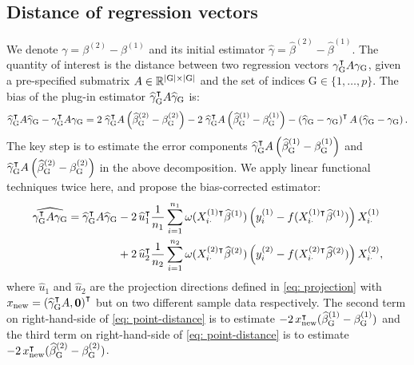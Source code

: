 \subsection{Distance of regression vectors}
\label{subsec: distance}
We denote $\gamma = \beta^{(2)} - \beta^{(1)}$ and its initial estimator $\widehat{\gamma} = \widehat{\beta}^{(2)} - \widehat{\beta}^{(1)}$. The quantity of interest is the distance between two regression vectors $\gamma^\intercal_{\mathrm{G}} A \gamma_{\mathrm{G}}$, given a pre-specified submatrix $A \in \mathbb{R}^{|\mathrm{G}|\times |\mathrm{G}|}$ and the set of indices $\mathrm{G} \in \{1,\ldots, p\}$. The bias of the plug-in estimator $\widehat{\gamma}^\intercal_{\mathrm{G}} A \widehat{\gamma}_{\mathrm{G}}$ is:
\begin{equation*}
    \widehat{\gamma}^\intercal_{\mathrm{G}} A \widehat{\gamma}_{\mathrm{G}} - \gamma^\intercal_{\mathrm{G}} A \gamma_{\mathrm{G}} = 2\; \widehat{\gamma}^\intercal_{\mathrm{G}} A \left(\widehat{\beta}^{(2)}_{\mathrm{G}} - \beta^{(2)}_{\mathrm{G}}\right) - 2\; \widehat{\gamma}^\intercal_{\mathrm{G}} A \left(\widehat{\beta}^{(1)}_{\mathrm{G}} - \beta^{(1)}_{\mathrm{G}}\right) - \left(\widehat{\gamma}_{\mathrm{G}} - \gamma_{\mathrm{G}}\right)^\intercal A \left(\widehat{\gamma}_{\mathrm{G}} - \gamma_{\mathrm{G}}\right).
\end{equation*}
The key step is to estimate the error components $\widehat{\gamma}_{\mathrm{G}}^\intercal A \left(\widehat{\beta}_{\mathrm{G}}^{(1)} -  \beta_{\mathrm{G}}^{(1)}\right)$ and $ \widehat{\gamma}_{\mathrm{G}}^\intercal A \left(\widehat{\beta}_{\mathrm{G}}^{(2)} - \beta_{\mathrm{G}}^{(2)}\right) $ in the above decomposition. We apply linear functional techniques twice here, and propose the bias-corrected estimator:
\begin{equation}
    \begin{aligned}
        \widehat{\gamma_{\mathrm{G}}^\intercal A \gamma_{\mathrm{G}}} = 
        \widehat{\gamma}_{\mathrm{G}}^\intercal A \widehat{\gamma}_{\mathrm{G}} & - 2\,\widehat{u}_1^{\intercal}\frac{1}{n_1}\sum_{i=1}^{n_1}\omega(X_{i\cdot}^{(1)\intercal}\widehat{\beta}^{(1)})\left(y_i^{(1)} - f(X_{i\cdot}^{(1)\intercal}\widehat{\beta}^{(1)})\right)X_{i\cdot}^{(1)} \\
        &+ 2\,\widehat{u}_2^{\intercal}\frac{1}{n_2}\sum_{i=1}^{n_2}\omega(X_{i\cdot}^{(2)\intercal}\widehat{\beta}^{(2)})\left(y_i^{(2)} - f(X_{i\cdot}^{(2)\intercal}\widehat{\beta}^{(2)})\right)X_{i\cdot}^{(2)},
    \end{aligned}
    \label{eq: point-distance}
\end{equation}
where $\widehat{u}_1$ and $\widehat{u}_2$ are the projection directions defined in \eqref{eq: projection} with $x_{\rm new}=\left(\widehat{\gamma}_{\mathrm{G}}^\intercal A,  \mathbf{0} \right)^\intercal$ but on two different sample data respectively.
The second term on right-hand-side of \eqref{eq: point-distance} is to estimate $-2\, x_{\rm new}^\intercal(\widehat{\beta}_{\mathrm{G}}^{(1)} - \beta_{\mathrm{G}}^{(1)})$
 and the third term on right-hand-side of \eqref{eq: point-distance} is to estimate $-2\, x_{\rm new}^\intercal(\widehat{\beta}_{\mathrm{G}}^{(2)} - \beta_{\mathrm{G}}^{(2)})$. 

